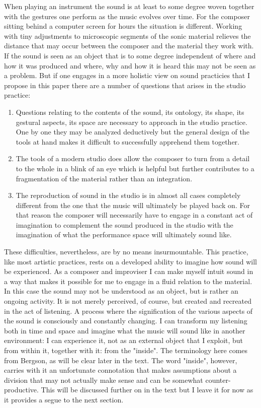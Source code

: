 \documentclass[11pt]{article}
\begin{document}
When playing an instrument the sound is at least to some degree woven together with the gestures one perform as the music evolves over time.
For the composer sitting behind a computer screen for hours the situation is different.
Working with  tiny adjustments to microscopic segments of the sonic material relieves the distance that may occur between the composer and the material they work with.
If the sound is seen as an object that is to some degree independent of where and how it was produced and where, why and how it is heard this may not be seen as a problem.
But if one engages in a more holistic view on sound practicies that I propose in this paper there are a number of questions that arises in the studio practice:

\begin{enumerate}
\item Questions relating to the contents of the sound, its ontology, its shape, its gestural aspects, its space are necessary to approach in the studio practice. One by one they may be analyzed deductively but the general design of the tools at hand makes it difficult to successfully apprehend them together.
\item The tools of a modern studio does allow the composer to turn from a detail to the whole in a blink of an eye which is helpful but further contributes to a fragmentation of the material rather than an integration.
\item The reproduction of sound in the studio is in almost all cases completely different from the one that the music will ultimately be played back on. For that reason the composer will necessarily have to engage in a constant act of imagination to complement the sound produced in the studio with the imagination of what the performance space will ultimately sound like.
\end{enumerate}

These difficulties, nevertheless, are by no means insurmountable.
This practice, like most artistic practices, rests on a developed ability to imagine how sound will be experienced.
As a composer and improviser I can make myself intuit sound in a way that makes it possible for me to engage in a fluid relation to the material.
In this case the sound may not be understood as an object, but is rather an ongoing activity.
It is not merely perceived, of course, but created and recreated in the act of listening.
A process where the signification of the various aspects of the sound is consciously and constantly changing.
I can transform my listening both in time and space and imagine what the music will sound like in another environment: I can experience it, not as an external object that I exploit, but from within it, together with it: from the "inside".
The terminology here comes from Bergson, as will be clear later in the text. The word "inside", however, carries with it an unfortunate connotation that makes assumptions about a division that may not actually make sense and can be  somewhat counter-productive.
This will be discussed further on in the text but I leave it for now as it provides a segue to the next section.
\end{document}
